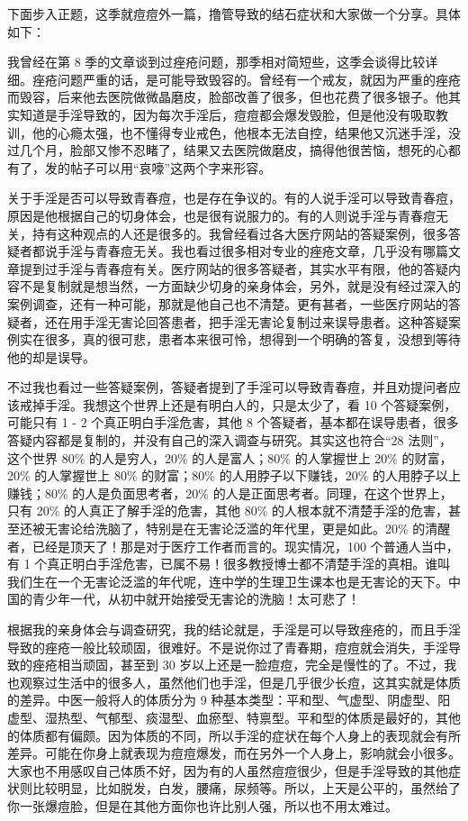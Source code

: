 \documentclass{ctexart}
\begin{document}
下面步入正题，这季就痘痘外一篇，撸管导致的结石症状和大家做一个分享。具体如下：

我曾经在第 8 季的文章谈到过痤疮问题，那季相对简短些，这季会谈得比较详细。痤疮问题严重的话，是可能导致毁容的。曾经有一个戒友，就因为严重的痤疮而毁容，后来他去医院做微晶磨皮，脸部改善了很多，但也花费了很多银子。他其实知道是手淫导致的，因为每次手淫后，痘痘都会爆发毁脸，但是他没有吸取教训，他的心瘾太强，也不懂得专业戒色，他根本无法自控，结果他又沉迷手淫，没过几个月，脸部又惨不忍睹了，结果又去医院做磨皮，搞得他很苦恼，想死的心都有了，发的帖子可以用“哀嚎”这两个字来形容。

关于手淫是否可以导致青春痘，也是存在争议的。有的人说手淫可以导致青春痘，原因是他根据自己的切身体会，也是很有说服力的。有的人则说手淫与青春痘无关，持有这种观点的人还是很多的。我曾经看过各大医疗网站的答疑案例，很多答疑者都说手淫与青春痘无关。我也看过很多相对专业的痤疮文章，几乎没有哪篇文章提到过手淫与青春痘有关。医疗网站的很多答疑者，其实水平有限，他的答疑内容不是复制就是想当然，一方面缺少切身的亲身体会，另外，就是没有经过深入的案例调查，还有一种可能，那就是他自己也不清楚。更有甚者，一些医疗网站的答疑者，还在用手淫无害论回答患者，把手淫无害论复制过来误导患者。这种答疑案例实在很多，真的很可悲，患者本来很可怜，想得到一个明确的答复，没想到等待他的却是误导。

不过我也看过一些答疑案例，答疑者提到了手淫可以导致青春痘，并且劝提问者应该戒掉手淫。我想这个世界上还是有明白人的，只是太少了，看 10 个答疑案例，可能只有 1 - 2 个真正明白手淫危害，其他 8 个答疑者，基本都在误导患者，很多答疑内容都是复制的，并没有自己的深入调查与研究。其实这也符合“28 法则”，这个世界 80\% 的人是穷人，20\% 的人是富人；80\% 的人掌握世上 20\% 的财富，20\% 的人掌握世上 80\% 的财富；80\% 的人用脖子以下赚钱，20\% 的人用脖子以上赚钱；80\% 的人是负面思考者，20\% 的人是正面思考者。同理，在这个世界上，只有 20\% 的人真正了解手淫的危害，其他 80\% 的人根本就不清楚手淫的危害，甚至还被无害论给洗脑了，特别是在无害论泛滥的年代里，更是如此。20\% 的清醒者，已经是顶天了！那是对于医疗工作者而言的。现实情况，100 个普通人当中，有 1 个真正明白手淫危害，已属不易！很多教授博士都不清楚手淫的真相。谁叫我们生在一个无害论泛滥的年代呢，连中学的生理卫生课本也是无害论的天下。中国的青少年一代，从初中就开始接受无害论的洗脑！太可悲了！

根据我的亲身体会与调查研究，我的结论就是，手淫是可以导致痤疮的，而且手淫导致的痤疮一般比较顽固，很难好。不是说你过了青春期，痘痘就会消失，手淫导致的痤疮相当顽固，甚至到 30 岁以上还是一脸痘痘，完全是慢性的了。不过，我也观察过生活中的很多人，虽然他们也手淫，但是几乎很少长痘，这其实就是体质的差异。中医一般将人的体质分为 9 种基本类型：平和型、气虚型、阴虚型、阳虚型、湿热型、气郁型、痰湿型、血瘀型、特禀型。平和型的体质是最好的，其他的体质都有偏颇。因为体质的不同，所以手淫的症状在每个人身上的表现就会有所差异。可能在你身上就表现为痘痘爆发，而在另外一个人身上，影响就会小很多。大家也不用感叹自己体质不好，因为有的人虽然痘痘很少，但是手淫导致的其他症状则比较明显，比如脱发，白发，腰痛，尿频等。所以，上天是公平的，虽然给了你一张爆痘脸，但是在其他方面你也许比别人强，所以也不用太难过。
\end{document}
